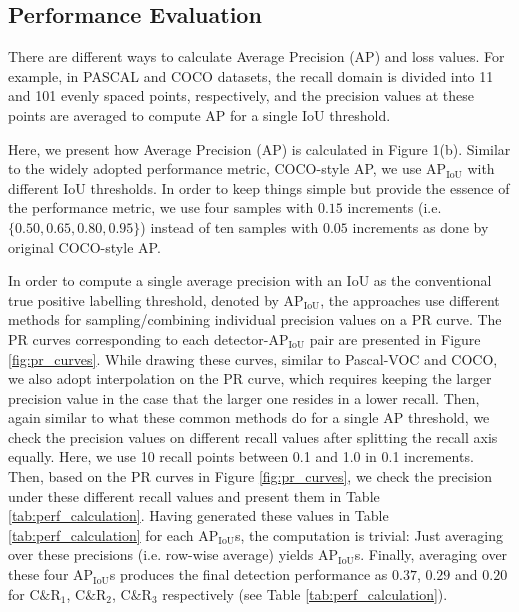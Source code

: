 \documentclass{article}
\begin{document}
\subsection{Performance Evaluation}
\label{subsec:performance_estimation}
There are different ways to calculate Average Precision (AP) and loss values. For example, in PASCAL \cite{PASCAL} and COCO  \cite{COCO} datasets, the recall domain is divided into 11 and 101 evenly spaced points, respectively, and the  precision values at these points are averaged to compute AP for a single IoU threshold.

Here, we present how Average Precision ($\mathrm{AP}$) is calculated in Figure 1(b). Similar to the widely adopted performance metric, COCO-style AP, we use $\mathrm{AP}_\mathrm{IoU}$ with different $\mathrm{IoU}$ thresholds. In order to keep things simple but provide the essence of the performance metric, we use four samples with $0.15$ increments (i.e. $\{0.50, 0.65, 0.80,0.95\}$) instead of ten samples with $0.05$ increments as done by original COCO-style AP. 

In order to compute a single average precision with an IoU as the conventional true positive labelling threshold, denoted by $\mathrm{AP}_\mathrm{IoU}$, the approaches use different methods for sampling/combining individual precision values on a PR curve. The PR curves corresponding to each detector-$\mathrm{AP}_\mathrm{IoU}$ pair are presented in Figure \ref{fig:pr_curves}. While drawing these curves, similar to Pascal-VOC and COCO, we also adopt interpolation on the PR curve, which requires keeping the larger precision value in the case that the larger one resides in a lower recall. Then, again similar to what these common methods do for a single AP threshold, we check the precision values on different recall values after splitting the recall axis equally. Here, we use 10 recall points between 0.1 and 1.0 in 0.1 increments. Then,  based on the PR curves in Figure \ref{fig:pr_curves}, we check the precision under these different recall values and present them in Table \ref{tab:perf_calculation}. Having generated these values in Table \ref{tab:perf_calculation} for each $\mathrm{AP}_\mathrm{IoU}$s, the computation is trivial: Just averaging over these precisions (i.e. row-wise average) yields $\mathrm{AP}_\mathrm{IoU}$s. Finally, averaging over these four $\mathrm{AP}_\mathrm{IoU}$s produces the final detection performance as $0.37$, $0.29$ and $0.20$ for $\mathrm{C\&R_1}$, $\mathrm{C\&R_2}$, $\mathrm{C\&R_3}$ respectively (see Table \ref{tab:perf_calculation}). 
\end{document}
